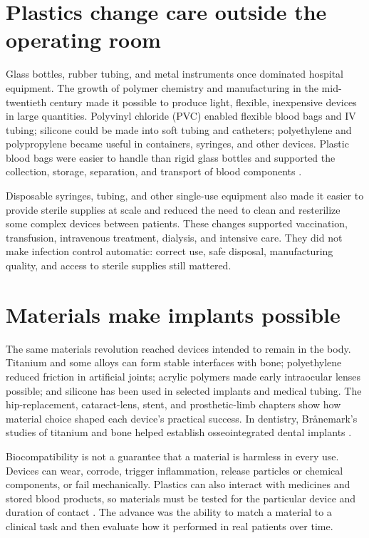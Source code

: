 \documentclass[12pt,oneside]{book}
\begin{document}
\section{Plastics change care outside the operating room}
Glass bottles, rubber tubing, and metal instruments once dominated hospital
equipment. The growth of polymer chemistry and manufacturing in the
mid-twentieth century made it possible to produce light, flexible, inexpensive
devices in large quantities. Polyvinyl chloride (PVC) enabled flexible blood
bags and IV tubing; silicone could be made into soft tubing and catheters;
polyethylene and polypropylene became useful in containers, syringes, and
other devices. Plastic blood bags were easier to handle than rigid glass
bottles and supported the collection, storage, separation, and transport of
blood components \cite{medicalPlasticsReview,bloodBagPlastics}.

Disposable syringes, tubing, and other single-use equipment also made it
easier to provide sterile supplies at scale and reduced the need to clean and
resterilize some complex devices between patients. These changes supported
vaccination, transfusion, intravenous treatment, dialysis, and intensive care.
They did not make infection control automatic: correct use, safe disposal,
manufacturing quality, and access to sterile supplies still mattered.

\section{Materials make implants possible}
The same materials revolution reached devices intended to remain in the body.
Titanium and some alloys can form stable interfaces with bone; polyethylene
reduced friction in artificial joints; acrylic polymers made early intraocular
lenses possible; and silicone has been used in selected implants and medical
tubing. The hip-replacement, cataract-lens, stent, and prosthetic-limb chapters
show how material choice shaped each device's practical success. In dentistry,
Br\aa nemark's studies of titanium and bone helped establish osseointegrated
dental implants \cite{titaniumDentistryReview}.

Biocompatibility is not a guarantee that a material is harmless in every use.
Devices can wear, corrode, trigger inflammation, release particles or chemical
components, or fail mechanically. Plastics can also interact with medicines
and stored blood products, so materials must be tested for the particular
device and duration of contact \cite{medicalPlasticsReview,bloodBagPlastics}.
The advance was the ability to match a material to a clinical task and then
evaluate how it performed in real patients over time.
\end{document}
